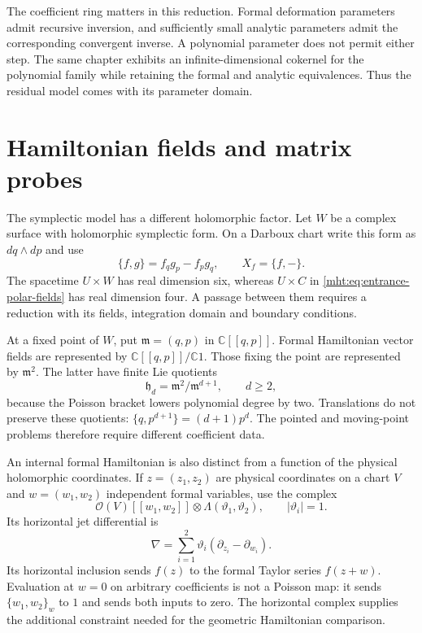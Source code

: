 The coefficient ring matters in this reduction. Formal deformation
parameters admit recursive inversion, and sufficiently small analytic
parameters admit the corresponding convergent inverse. A polynomial
parameter does not permit either step. The same chapter exhibits an
infinite-dimensional cokernel for the polynomial family while retaining
the formal and analytic equivalences. Thus the residual model comes
with its parameter domain.

\section{Hamiltonian fields and matrix probes}

The symplectic model has a different holomorphic factor. Let $W$ be a
complex surface with holomorphic symplectic form. On a Darboux chart
write this form as $dq\wedge dp$ and use
\[
 \{f,g\}=f_qg_p-f_pg_q,\qquad X_f=\{f,-\}.
\]
The spacetime $U\times W$ has real dimension six, whereas $U\times C$
in \eqref{mht:eq:entrance-polar-fields} has real dimension four.
A passage between them requires a reduction with its fields,
integration domain and boundary conditions.

At a fixed point of $W$, put $\mathfrak m=(q,p)$ in
$\mathbb C[[q,p]]$. Formal Hamiltonian vector fields are represented
by $\mathbb C[[q,p]]/\mathbb C1$. Those fixing the point are represented
by $\mathfrak m^2$. The latter have finite Lie quotients
\[
 \mathfrak h_d=\mathfrak m^2/\mathfrak m^{d+1},\qquad d\geq2,
\]
because the Poisson bracket lowers polynomial degree by two.
Translations do not preserve these quotients:
$\{q,p^{d+1}\}=(d+1)p^d$. The pointed and moving-point problems
therefore require different coefficient data.

An internal formal Hamiltonian is also distinct from a function of
the physical holomorphic coordinates. If $z=(z_1,z_2)$ are physical
coordinates on a chart $V$ and $w=(w_1,w_2)$ independent formal variables,
use the complex
\[
 \mathcal O(V)[[w_1,w_2]]\otimes\Lambda(\vartheta_1,\vartheta_2),
 \qquad |\vartheta_i|=1.
\]
Its horizontal jet differential is
\[
 \nabla=\sum_{i=1}^2\vartheta_i
              (\partial_{z_i}-\partial_{w_i}).
\]
Its horizontal inclusion sends $f(z)$ to the formal Taylor series
$f(z+w)$. Evaluation at $w=0$ on arbitrary coefficients is not a
Poisson map: it sends $\{w_1,w_2\}_w$ to $1$ and sends both inputs
to zero. The horizontal complex supplies the additional constraint
needed for the geometric Hamiltonian comparison.

